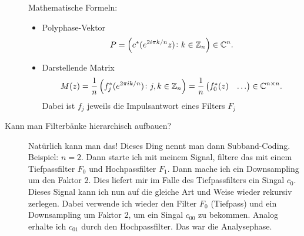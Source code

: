 \begin{description}
  	Mathematische Formeln:
  	\begin{itemize}
    	\item Polyphase-Vektor
    	\[
      	P = \left( c^{*}(e^{2i\pi k/n}z) \colon k \in \mathbb{Z}_{n} \right) \in \mathbb{C}^{n}.
    	\]
    	\item Darstellende Matrix
    	\[
      	M(z) =
      	\frac{1}{n} \left( f^{*}_{j}(e^{2\pi i k / n}) \colon j,k \in \mathbb{Z}_{n} \right) 
      	= \frac{1}{n} \begin{pmatrix}
      	f^{*}_{0}(z) & \hdots
      	\end{pmatrix} \in \mathbb{C}^{n \times n}.
    	\]
    	Dabei ist $ f_{j} $ jeweils die Impulsantwort eines Filters $ F_{j} $
  	\end{itemize}
	\item[Kann man Filterbänke hierarchisch aufbauen?]
  	Natürlich kann man das! Dieses Ding nennt man dann Subband-Coding. Beispiel: $ n = 2 $. Dann 
  	starte ich mit meinem Signal, filtere das mit einem Tiefpassfilter $ F_{0} $ und Hochpassfilter 
  	$ F_{1} $. Dann mache ich ein Downsampling um den Faktor $ 2 $. Dies liefert mir im Falle des 
  	Tiefpassfilters ein Singal $ c_{0} $. Dieses Signal kann ich nun auf die gleiche Art und Weise 
  	wieder rekursiv zerlegen. Dabei verwende ich wieder den Filter $ F_{0} $ (Tiefpass) und ein 
  	Downsampling um Faktor $ 2 $, um ein Singal $ c_{00} $ zu bekommen. Analog erhalte ich $ c_{01} 
  	$ durch den Hochpassfilter. Das war die Analysephase.
  	

\end{description}
